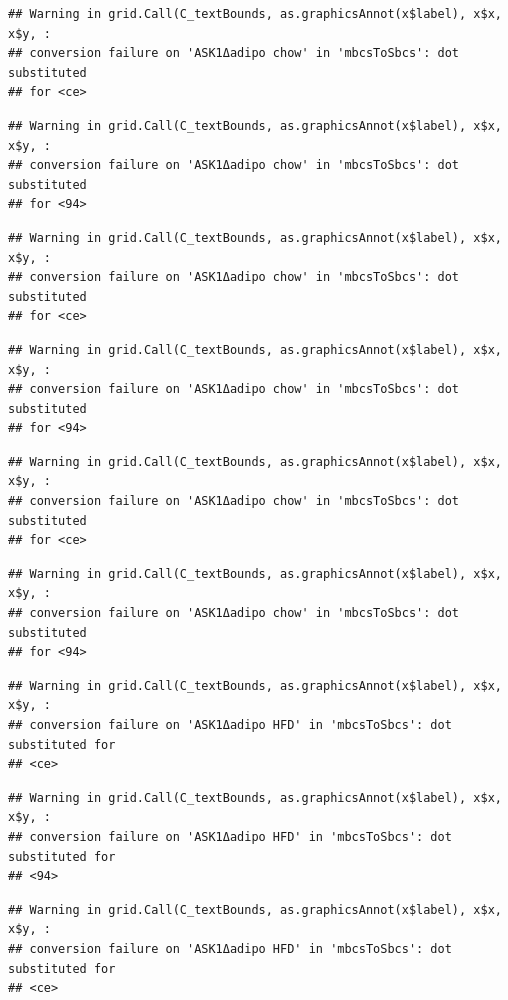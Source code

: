 \documentclass[]{book}
\begin{document}
\begin{verbatim}
## Warning in grid.Call(C_textBounds, as.graphicsAnnot(x$label), x$x, x$y, :
## conversion failure on 'ASK1Δadipo chow' in 'mbcsToSbcs': dot substituted
## for <ce>
\end{verbatim}

\begin{verbatim}
## Warning in grid.Call(C_textBounds, as.graphicsAnnot(x$label), x$x, x$y, :
## conversion failure on 'ASK1Δadipo chow' in 'mbcsToSbcs': dot substituted
## for <94>
\end{verbatim}

\begin{verbatim}
## Warning in grid.Call(C_textBounds, as.graphicsAnnot(x$label), x$x, x$y, :
## conversion failure on 'ASK1Δadipo chow' in 'mbcsToSbcs': dot substituted
## for <ce>
\end{verbatim}

\begin{verbatim}
## Warning in grid.Call(C_textBounds, as.graphicsAnnot(x$label), x$x, x$y, :
## conversion failure on 'ASK1Δadipo chow' in 'mbcsToSbcs': dot substituted
## for <94>
\end{verbatim}

\begin{verbatim}
## Warning in grid.Call(C_textBounds, as.graphicsAnnot(x$label), x$x, x$y, :
## conversion failure on 'ASK1Δadipo chow' in 'mbcsToSbcs': dot substituted
## for <ce>
\end{verbatim}

\begin{verbatim}
## Warning in grid.Call(C_textBounds, as.graphicsAnnot(x$label), x$x, x$y, :
## conversion failure on 'ASK1Δadipo chow' in 'mbcsToSbcs': dot substituted
## for <94>
\end{verbatim}

\begin{verbatim}
## Warning in grid.Call(C_textBounds, as.graphicsAnnot(x$label), x$x, x$y, :
## conversion failure on 'ASK1Δadipo HFD' in 'mbcsToSbcs': dot substituted for
## <ce>
\end{verbatim}

\begin{verbatim}
## Warning in grid.Call(C_textBounds, as.graphicsAnnot(x$label), x$x, x$y, :
## conversion failure on 'ASK1Δadipo HFD' in 'mbcsToSbcs': dot substituted for
## <94>
\end{verbatim}

\begin{verbatim}
## Warning in grid.Call(C_textBounds, as.graphicsAnnot(x$label), x$x, x$y, :
## conversion failure on 'ASK1Δadipo HFD' in 'mbcsToSbcs': dot substituted for
## <ce>
\end{verbatim}
\end{document}
